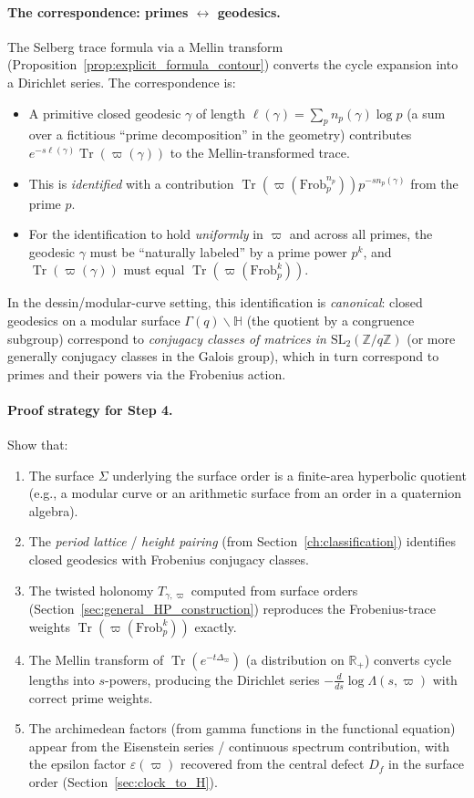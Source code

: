 \documentclass[11pt,oneside]{amsbook}
\numberwithin{equation}{section}
\theoremstyle{plain}
\theoremstyle{definition}
\theoremstyle{remark}
\newcommand{\HH}{\mathbb{H}}
\newcommand{\Z}{\mathbb{Z}}
\DeclareMathOperator{\Tr}{\mathrm{Tr}}
\begin{document}
\paragraph{The correspondence: primes $\leftrightarrow$ geodesics.}
The Selberg trace formula via a Mellin transform (Proposition~\ref{prop:explicit_formula_contour}) converts the cycle expansion into a Dirichlet series.
The correspondence is:
\begin{itemize}
\item A primitive closed geodesic $\gamma$ of length $\ell(\gamma) = \sum_p n_p(\gamma)\log p$ (a sum over a fictitious ``prime decomposition'' in the geometry) contributes $e^{-s\ell(\gamma)} \Tr(\varpi(\gamma))$ to the Mellin-transformed trace.
\item This is \emph{identified} with a contribution $\Tr(\varpi(\mathrm{Frob}_p^{n_p})) p^{-s n_p(\gamma)}$ from the prime $p$.
\item For the identification to hold \emph{uniformly} in $\varpi$ and across all primes, the geodesic $\gamma$ must be ``naturally labeled'' by a prime power $p^k$, and $\Tr(\varpi(\gamma))$ must equal $\Tr(\varpi(\mathrm{Frob}_p^k))$.
\end{itemize}

In the dessin/modular-curve setting, this identification is \emph{canonical}:
closed geodesics on a modular surface $\Gamma(q)\backslash\HH$ (the quotient by a congruence subgroup) correspond to \emph{conjugacy classes of matrices in $\mathrm{SL}_2(\Z/q\Z)$} (or more generally conjugacy classes in the Galois group), which in turn correspond to primes and their powers via the Frobenius action.

\paragraph{Proof strategy for Step 4.}
Show that:
\begin{enumerate}[label=(\roman*)]
\item The surface $\Sigma$ underlying the surface order is a finite-area hyperbolic quotient (e.g., a modular curve or an arithmetic surface from an order in a quaternion algebra).
\item The \emph{period lattice} / \emph{height pairing} (from Section~\ref{ch:classification}) identifies closed geodesics with Frobenius conjugacy classes.
\item The twisted holonomy $T_{\gamma,\varpi}$ computed from surface orders (Section~\ref{sec:general_HP_construction}) reproduces the Frobenius-trace weights $\Tr(\varpi(\mathrm{Frob}_p^k))$ exactly.
\item The Mellin transform of $\Tr(e^{-t\Delta_\varpi})$ (a distribution on $\mathbb{R}_+$) converts cycle lengths into $s$-powers, producing the Dirichlet series $-\frac{d}{ds}\log\Lambda(s,\varpi)$ with correct prime weights.
\item The archimedean factors (from gamma functions in the functional equation) appear from the Eisenstein series / continuous spectrum contribution, with the epsilon factor $\varepsilon(\varpi)$ recovered from the central defect $D_f$ in the surface order (Section~\ref{sec:clock_to_H}).
\end{enumerate}
\end{document}

